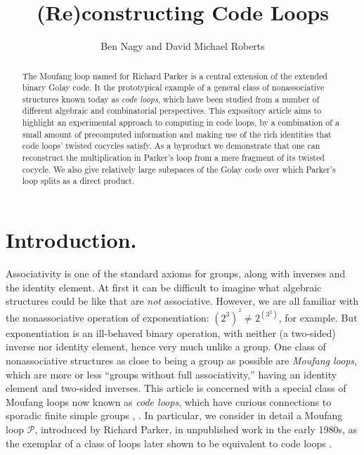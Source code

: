 \documentclass{article}
\theoremstyle{plain}
\theoremstyle{definition}
\def \cP {\mathcal{P}}
\begin{document}
\title{(Re)constructing Code Loops}
\author{%
Ben Nagy and David Michael Roberts
}

\maketitle

\begin{abstract}
The Moufang loop named for Richard Parker is a central extension of the extended binary Golay code. 
It the prototypical example of a general class of nonassociative structures known today as \emph{code loops}, which have been studied from a number of different algebraic and combinatorial perspectives.
This expository article aims to highlight an experimental approach to computing in code loops, by a combination of a small amount of precomputed information and making use of the rich identities that code loops' twisted cocycles satisfy.
As a byproduct we demonstrate that one can reconstruct the multiplication in Parker's loop from a mere fragment of its twisted cocycle. 
We also give relatively large subspaces of the Golay code over which Parker's loop splits as a direct product.
\end{abstract}


\section{Introduction.}

Associativity is one of the standard axioms for groups, along with inverses and the identity element.
At first it can be difficult to imagine what algebraic structures could be like that are \emph{not} associative. 
However, we are all familiar with the nonassociative operation of exponentiation:  $(2^3)^{\!{}^2} \neq 2^{(3^2)}$, for example.
But exponentiation is an ill-behaved binary operation, with neither (a two-sided) inverse nor identity element, hence very much unlike a group. 
One class of nonassociative structures as close to being a group as possible are \emph{Moufang loops}, which are more or less ``groups without full associativity,'' having an identity element and two-sided inverses.
This article is concerned with a special class of Moufang loops now known as \emph{code loops}, which have curious connections to sporadic finite simple groups \cite{Conway}, \cite[\S 7]{Griess87}.
In particular, we consider in detail a Moufang loop $\cP$, introduced by Richard Parker, in unpublished work in the early 1980s, as the exemplar of a class of loops later shown to be equivalent to code loops \cite{Griess}.
\end{document}
